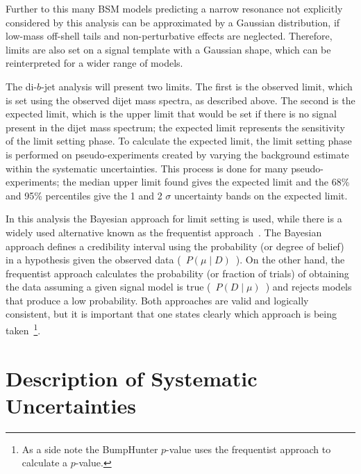 Further to this many BSM models predicting a narrow resonance
not explicitly considered by this analysis
can be approximated by a Gaussian distribution,
if low-mass off-shell tails and non-perturbative effects are neglected.
Therefore, limits are also set on a signal template with a Gaussian shape,
which can be reinterpreted for a wider range of models.
  
The di-$b$-jet analysis will present two limits.
The first is the observed limit, which is set using the observed dijet mass spectra, as described above.
The second is the expected limit, which is the upper limit that would be set if there is no signal present in the dijet mass spectrum;
the expected limit represents the sensitivity of the limit setting phase.
To calculate the expected limit, the limit setting phase is performed on pseudo-experiments
created by varying the background estimate within the systematic uncertainties.
This process is done for many pseudo-experiments; the median upper limit found gives the expected limit
and the 68\% and 95\% percentiles give the 1 and 2 $\sigma$ uncertainty bands on the expected limit.

In this analysis the Bayesian approach for limit setting is used,
while there is a widely used alternative known as the frequentist approach~\cite{lim-cowan}.
The Bayesian approach defines a credibility interval using the probability (or degree of belief) in a hypothesis given the observed data \mbox{( $P(\mu \mid D)$ )}.
On the other hand, the frequentist approach calculates the probability (or fraction of trials)
of obtaining the data assuming a given signal model is true \mbox{( $P(D \mid \mu)$ )} and rejects models that produce a low probability.
Both approaches are valid and logically consistent,
but it is important that one states clearly which approach is being taken~\footnote{As a side note the BumpHunter $p$-value uses the frequentist approach to calculate a $p$-value.}.

\section{Description of Systematic Uncertainties}
\label{sec:lim-syst}

